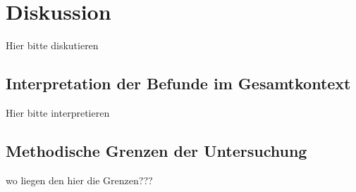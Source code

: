 \chapter{Diskussion}
\label{chapter:kapitel5}

Hier bitte diskutieren

\section{Interpretation der Befunde im Gesamtkontext}
\label{gesamtkontext}

Hier bitte interpretieren

\section{Methodische Grenzen der Untersuchung}
\label{grenzen}

wo liegen den hier die Grenzen???
